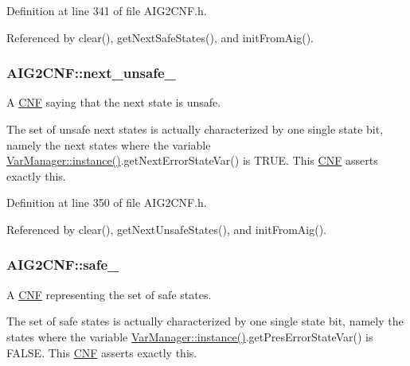 Definition at line 341 of file A\-I\-G2\-C\-N\-F.\-h.



Referenced by clear(), get\-Next\-Safe\-States(), and init\-From\-Aig().

\hypertarget{classAIG2CNF_a0430b9b4ff38a7b0ae339fb0abd191c9}{
\subsubsection[{next\-\_\-unsafe\-\_\-}]{ A\-I\-G2\-C\-N\-F\-::next\-\_\-unsafe\-\_\-\hspace{0.3cm}{\ttfamily [protected]}}}\label{classAIG2CNF_a0430b9b4ff38a7b0ae339fb0abd191c9}


A \hyperlink{classCNF}{C\-N\-F} saying that the next state is unsafe. 

The set of unsafe next states is actually characterized by one single state bit, namely the next states where the variable \hyperlink{classVarManager_ac1a84b367c26dfc5ee9e612f7d61b288}{Var\-Manager\-::instance()}.get\-Next\-Error\-State\-Var() is T\-R\-U\-E. This \hyperlink{classCNF}{C\-N\-F} asserts exactly this. 

Definition at line 350 of file A\-I\-G2\-C\-N\-F.\-h.



Referenced by clear(), get\-Next\-Unsafe\-States(), and init\-From\-Aig().

\hypertarget{classAIG2CNF_a394d2a3600bc3bec864cf08acac61437}{
\subsubsection[{safe\-\_\-}]{ A\-I\-G2\-C\-N\-F\-::safe\-\_\-\hspace{0.3cm}{\ttfamily [protected]}}}\label{classAIG2CNF_a394d2a3600bc3bec864cf08acac61437}


A \hyperlink{classCNF}{C\-N\-F} representing the set of safe states. 

The set of safe states is actually characterized by one single state bit, namely the states where the variable \hyperlink{classVarManager_ac1a84b367c26dfc5ee9e612f7d61b288}{Var\-Manager\-::instance()}.get\-Pres\-Error\-State\-Var() is F\-A\-L\-S\-E. This \hyperlink{classCNF}{C\-N\-F} asserts exactly this. 

